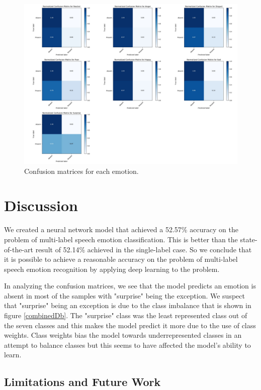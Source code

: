 \documentclass[conference]{IEEEtran}
\begin{document}
\begin{figure}[h!]
	\centering
	\hspace{6mm}
	\includegraphics[width=\textwidth]{confusion_matrix.png}
	\caption{Confusion matrices for each emotion.}
	\label{confusionMatrix}
\end{figure}

\section{Discussion}

We created a neural network model that achieved a 52.57\% accuracy on the problem of multi-label speech emotion classification. This is better than the state-of-the-art result of 52.14\% achieved in the single-label case. \cite{Zhao2019} So we conclude that it is possible to achieve a reasonable accuracy on the problem of multi-label speech emotion recognition by applying deep learning to the problem. 

In analyzing the confusion matrices, we see that the model predicts an emotion is absent in most of the samples with "surprise" being the exception. We suspect that "surprise" being an exception is due to the class imbalance that is shown in figure \ref{combinedDb}. The "surprise" class was the least represented class out of the seven classes and this makes the model predict it more due to the use of class weights. Class weights bias the model towards underrepresented classes in an attempt to balance classes but this seems to have affected the model's ability to learn.

\subsection{Limitations and Future Work}
\end{document}
